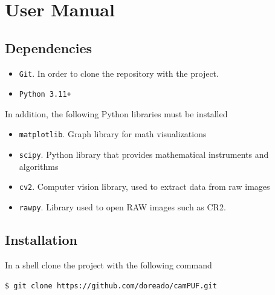 \chapter{User Manual}
\label{usermanual}
\section{Dependencies}\label{sec:dependecies}
\begin{itemize}
  \item \texttt{Git}. In order to clone the repository with the project.
  \item \texttt{Python 3.11+}
\end{itemize}
In addition, the following Python libraries must be installed
\begin{itemize}
  \item \texttt{matplotlib}. Graph library for math visualizations
  \item \texttt{scipy}. Python library that provides mathematical instruments and algorithms
  \item \texttt{cv2}. Computer vision library, used to extract data from raw images
  \item \texttt{rawpy}. Library used to open RAW images such as CR2.
\end{itemize}

\section{Installation}\label{sec:installation}
\noindent In a shell clone the project with the following command
\begin{lstlisting}[language=bash]
  $ git clone https://github.com/doreado/camPUF.git
\end{lstlisting}

